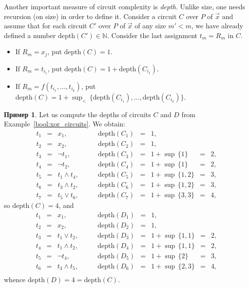 \documentclass[12pt,notitlepage]{article}
\theoremstyle{plain}
\theoremstyle{definition}
\newtheorem{exm}[thm]{Пример}
\theoremstyle{plain}
\newcommand{\N}{\mathbb{N}}
\newcommand{\1}{\mathbf{1}}
\newcommand{\0}{\mathbf{0}}
\begin{document}
Another important measure of circuit complexity is \emph{depth}. Unlike size, one needs recursion (on size) in order to define it. Consider a circuit $C$ over $P$ of $\vec x$ and assume that for each circuit $C'$ over $P$ of $\vec x$ of any size $m' < m$, we have already defined a number $\mathrm{depth}(C') \in \N$. Consider the last assignment $t_m = R_m$ in $C$.
\begin{itemize}
	\item If $R_m = x_j$, put $\mathrm{depth}(C) = 1$.
	\item If $R_m = t_{i_1}$, put $\mathrm{depth}(C) = 1 + \mathrm{depth}(C_{i_1})$.
	\item If $R_m = f(t_{i_1},\ldots, t_{i_k})$, put $\mathrm{depth}(C) = 1 + \sup_{<}\, \{ \mathrm{depth}(C_{i_1}), \ldots, \mathrm{depth}(C_{i_k}) \}$.
\end{itemize}

\begin{exm}
	Let us compute the depths of circuits $C$ and $D$ from Example~\ref{bool:xor_circuits}. We obtain:
	$$
	\begin{array}{rclrclcl}
		t_1 &=& x_1,\qquad &\mathrm{depth}(C_{1}) &=& 1,\\
		t_2 &=& x_2,\qquad &\mathrm{depth}(C_{2}) &=& 1,\\
		t_3 &=& \neg t_1,\qquad &\mathrm{depth}(C_{3}) &=&  1 + \sup\, \{1\} &=& 2,\\
		t_4 &=& \neg t_2,\qquad &\mathrm{depth}(C_{4}) &=&  1 + \sup\, \{1\} &=& 2,\\
		t_5 &=& t_1 \wedge t_4,\qquad &\mathrm{depth}(C_{5}) &=&  1 + \sup\, \{1, 2\} &=& 3,\\
		t_6 &=& t_3 \wedge t_2,\qquad &\mathrm{depth}(C_{6}) &=&  1 + \sup\, \{1, 2\} &=& 3,\\
		t_7 &=& t_5 \vee t_6,\qquad &\mathrm{depth}(C_{7}) &=&  1 + \sup\, \{3, 3\} &=& 4,
	\end{array}
	$$
	so $\mathrm{depth}(C) = 4$, and
	$$
	\begin{array}{rclrclcl}
		t_1 &=& x_1,\qquad &\mathrm{depth}(D_{1}) &=& 1,\\
		t_2 &=& x_2,\qquad &\mathrm{depth}(D_{2}) &=& 1,\\
		t_3 &=& t_1 \vee t_2,\qquad &\mathrm{depth}(D_3) &=&  1 + \sup\, \{1, 1\} &=& 2,\\
		t_4 &=& t_1 \wedge t_2,\qquad &\mathrm{depth}(D_4) &=&  1 + \sup\, \{1, 1\} &=& 2,\\
		t_5 &=&\neg t_4,\qquad &\mathrm{depth}(D_5) &=&  1 + \sup\, \{2\} &=& 3,\\
		t_6 &=& t_3 \wedge t_5,\qquad &\mathrm{depth}(D_6) &=&  1 + \sup\, \{2, 3\} &=& 4,\\
	\end{array}
	$$
	whence $\mathrm{depth}(D) = 4 = \mathrm{depth}(C)$.
\end{exm}
\end{document}
